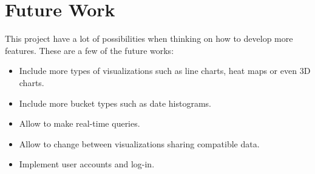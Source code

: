 \documentclass[a4paper, 12pt, english]{book}
\begin{document}
\section{Future Work}
\label{sec:future-work}
This project have a lot of possibilities when thinking on how to develop more features. These are a few of the future works:
\begin{itemize}
    \item Include more types of visualizations such as line charts, heat maps or even 3D charts.
    \item Include more bucket types such as date histograms.
    \item Allow to make real-time queries.
    \item Allow to change between visualizations sharing compatible data.
    \item Implement user accounts and log-in.
\end{itemize}







\cleardoublepage



\cleardoublepage
\end{document}
